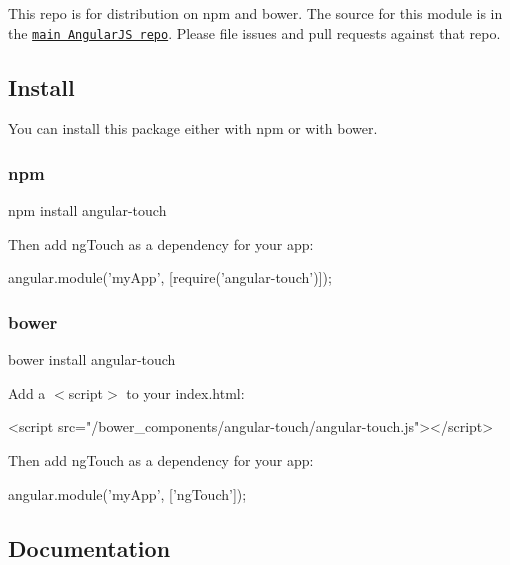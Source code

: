 This repo is for distribution on {\ttfamily npm} and {\ttfamily bower}. The source for this module is in the \href{https://github.com/angular/angular.js/tree/master/src/ngTouch}{\tt main Angular\+JS repo}. Please file issues and pull requests against that repo.

\subsection*{Install}

You can install this package either with {\ttfamily npm} or with {\ttfamily bower}.

\subsubsection*{npm}


\begin{DoxyCode}
npm install angular-touch
\end{DoxyCode}


Then add {\ttfamily ng\+Touch} as a dependency for your app\+:


\begin{DoxyCode}
angular.module('myApp', [require('angular-touch')]);
\end{DoxyCode}


\subsubsection*{bower}


\begin{DoxyCode}
bower install angular-touch
\end{DoxyCode}


Add a {\ttfamily $<$script$>$} to your {\ttfamily index.\+html}\+:


\begin{DoxyCode}
<script src="/bower\_components/angular-touch/angular-touch.js"></script>
\end{DoxyCode}


Then add {\ttfamily ng\+Touch} as a dependency for your app\+:


\begin{DoxyCode}
angular.module('myApp', ['ngTouch']);
\end{DoxyCode}


\subsection*{Documentation}

